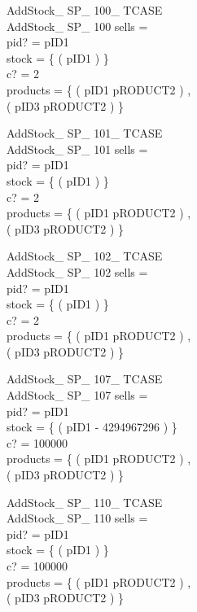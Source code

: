 \begin{schema}{AddStock\_ SP\_ 100\_ TCASE}\\
AddStock\_ SP\_ 100
\where
sells =~\emptyset \\
pid? = pID1 \\
stock = \{ ( pID1  ) \} \\
c? = 2 \\
products = \{ ( pID1 \mapsto pRODUCT2 ) , \\ ( pID3 \mapsto pRODUCT2 ) \}
\end{schema}


\begin{schema}{AddStock\_ SP\_ 101\_ TCASE}\\
AddStock\_ SP\_ 101
\where
sells =~\emptyset \\
pid? = pID1 \\
stock = \{ ( pID1  ) \} \\
c? = 2 \\
products = \{ ( pID1 \mapsto pRODUCT2 ) , \\ ( pID3 \mapsto pRODUCT2 ) \}
\end{schema}


\begin{schema}{AddStock\_ SP\_ 102\_ TCASE}\\
AddStock\_ SP\_ 102
\where
sells =~\emptyset \\
pid? = pID1 \\
stock = \{ ( pID1  ) \} \\
c? = 2 \\
products = \{ ( pID1 \mapsto pRODUCT2 ) , \\ ( pID3 \mapsto pRODUCT2 ) \}
\end{schema}


\begin{schema}{AddStock\_ SP\_ 107\_ TCASE}\\
AddStock\_ SP\_ 107
\where
sells =~\emptyset \\
pid? = pID1 \\
stock = \{ ( pID1 \mapsto - 4294967296 ) \} \\
c? = 100000 \\
products = \{ ( pID1 \mapsto pRODUCT2 ) , \\ ( pID3 \mapsto pRODUCT2 ) \}
\end{schema}


\begin{schema}{AddStock\_ SP\_ 110\_ TCASE}\\
AddStock\_ SP\_ 110
\where
sells =~\emptyset \\
pid? = pID1 \\
stock = \{ ( pID1  ) \} \\
c? = 100000 \\
products = \{ ( pID1 \mapsto pRODUCT2 ) , \\ ( pID3 \mapsto pRODUCT2 ) \}
\end{schema}


